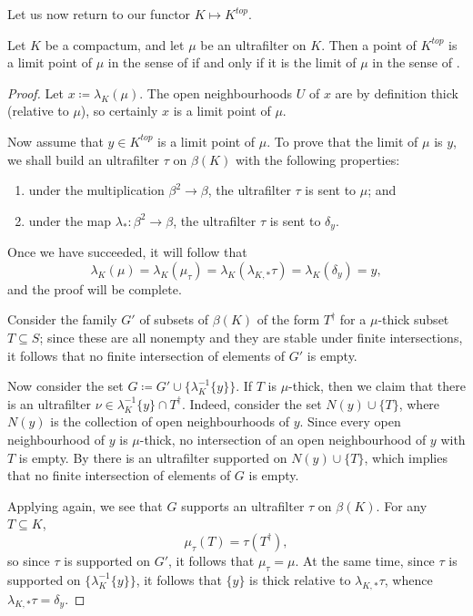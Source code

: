 Let us now return to our functor $ K \mapsto K^{\textit{top}} $.

\begin{lemma} \label{limitsarelimits}
	Let $ K $ be a compactum, and let $ \mu $ be an ultrafilter on $ K $.
	Then a point of $ K^{\textit{top}} $ is a limit point of $ \mu $ in the sense of  if and only if it is the limit of $ \mu $ in the sense of .
\end{lemma}

\begin{proof}
	Let $ x \coloneq \lambda_K(\mu) $.
	The open neighbourhoods $ U $ of $ x $ are by definition thick (relative to $ \mu $), so certainly $ x $ is a limit point of $ \mu $.

	Now assume that $ y \in K^{\textit{top}} $ is a limit point of $ \mu $.
	To prove that the limit of $ \mu $ is $ y $, we shall build an ultrafilter $ \tau $ on $ \beta(K) $ with the following properties:
	\begin{enumerate}
		\item under the multiplication $ \beta^2 \to \beta $, the ultrafilter $ \tau $ is sent to $ \mu $; and
		\item under the map $ \lambda_{\ast} \colon \beta^2 \to \beta  $, the ultrafilter $ \tau $ is sent to $\delta_y$.
	\end{enumerate}
	Once we have succeeded, it will follow that
	\[
		\lambda_K( \mu ) = \lambda_K( \mu_{\tau} ) = \lambda_K(\lambda_{K,\ast}\tau) = \lambda_K(\delta_y) = y \comma
	\]
	and the proof will be complete.

	Consider the family $ G' $ of subsets of $ \beta(K) $ of the form $ T^{\dag} $ for a $ \mu $-thick subset $ T \subseteq S $;
	since these are all nonempty and they are stable under finite intersections, it follows that no finite intersection of elements of $ G' $ is empty.

	Now consider the set $ G \coloneq G' \cup \{ \lambda_K^{-1}\{y\} \}$.
	If $ T $ is $ \mu $-thick, then we claim that there is an ultrafilter $ \nu \in \lambda_K^{-1}\{y\} \cap T^{\dag} $.
	Indeed, consider the set $ N(y) \cup \{T\} $, where $ N(y) $ is the collection of open neighbourhoods of $ y $.
	Since every open neighbourhood of $ y $ is $ \mu $-thick, no intersection of an open neighbourhood of $ y $ with $ T $ is empty.
	By  there is an ultrafilter supported on $ N(y) \cup \{T\} $, which implies that no finite intersection of elements of $ G $ is empty.

	Applying  again, we see that $ G $ supports an ultrafilter $ \tau $ on $ \beta(K) $.
	For any $ T \subseteq K $,
	\[
		\mu_{\tau}(T) = \tau(T^{\dag}) \comma
	\]
	so since $ \tau $ is supported on $ G' $, it follows that $ \mu_{\tau} = \mu $.
	At the same time, since $ \tau $ is supported on $ \{\lambda_K^{-1}\{y\}\} $, it follows that $ \{y\} $ is thick relative to $ \lambda_{K,\ast}\tau $, whence $ \lambda_{K,\ast}\tau = \delta_y $.
\end{proof}


